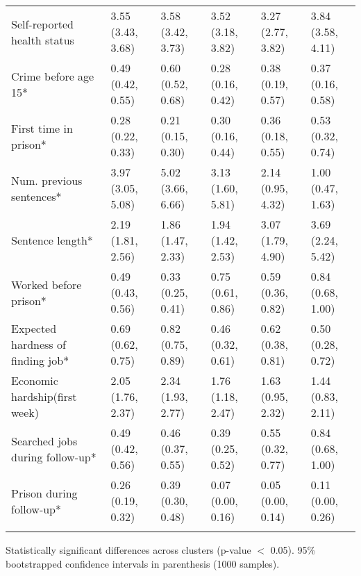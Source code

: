 \begin{table}[htp]
\begin{threeparttable}
\begin{tabular}{llllll}
  \quad Self-reported health status & 3.55 (3.43, 3.68) & 3.58 (3.42, 3.73) & 3.52 (3.18, 3.82) & 3.27 (2.77, 3.82) & 3.84 (3.58, 4.11) \\ 
  \quad Crime before age 15* & 0.49 (0.42, 0.55) & 0.60 (0.52, 0.68) & 0.28 (0.16, 0.42) & 0.38 (0.19, 0.57) & 0.37 (0.16, 0.58) \\ 
  \quad First time in prison* & 0.28 (0.22, 0.33) & 0.21 (0.15, 0.30) & 0.30 (0.16, 0.44) & 0.36 (0.18, 0.55) & 0.53 (0.32, 0.74) \\ 
  \quad Num. previous sentences* & 3.97 (3.05, 5.08) & 5.02 (3.66, 6.66) & 3.13 (1.60, 5.81) & 2.14 (0.95, 4.32) & 1.00 (0.47, 1.63) \\ 
  \quad Sentence length* & 2.19 (1.81, 2.56) & 1.86 (1.47, 2.33) & 1.94 (1.42, 2.53) & 3.07 (1.79, 4.90) & 3.69 (2.24, 5.42) \\ 
  \quad Worked before prison* & 0.49 (0.43, 0.56) & 0.33 (0.25, 0.41) & 0.75 (0.61, 0.86) & 0.59 (0.36, 0.82) & 0.84 (0.68, 1.00) \\ 
  \quad Expected hardness of finding job* & 0.69 (0.62, 0.75) & 0.82 (0.75, 0.89) & 0.46 (0.32, 0.61) & 0.62 (0.38, 0.81) & 0.50 (0.28, 0.72) \\ 
  \quad Economic hardship(first week) & 2.05 (1.76, 2.37) & 2.34 (1.93, 2.77) & 1.76 (1.18, 2.47) & 1.63 (0.95, 2.32) & 1.44 (0.83, 2.11) \\ 
  \quad Searched jobs during follow-up* & 0.49 (0.42, 0.56) & 0.46 (0.37, 0.55) & 0.39 (0.25, 0.52) & 0.55 (0.32, 0.77) & 0.84 (0.68, 1.00) \\ 
  \quad Prison during follow-up* & 0.26 (0.19, 0.32) & 0.39 (0.30, 0.48) & 0.07 (0.00, 0.16) & 0.05 (0.00, 0.14) & 0.11 (0.00, 0.26) \\ 
  \addlinespace
\addlinespace
\addlinespace
\hline
\addlinespace
\end{tabular}
\begin{tablenotes}
\scriptsize
    \item * Statistically significant differences across clusters (p-value $<$ 0.05). 95\% bootstrapped confidence intervals in parenthesis (1000 samples).
\end{tablenotes}
\end{threeparttable}
\end{table}
